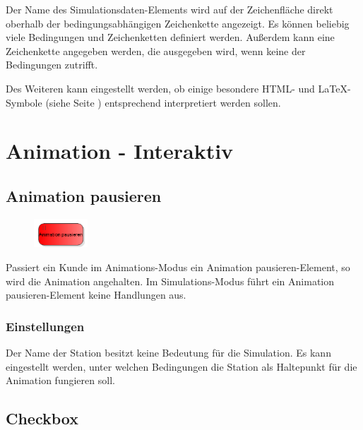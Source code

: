 Der Name des Simulationsdaten-Elements wird auf der Zeichenfläche direkt oberhalb der bedingungsabhängigen Zeichenkette angezeigt.
Es können beliebig viele Bedingungen und Zeichenketten definiert werden.
Außerdem kann eine Zeichenkette angegeben werden, die ausgegeben wird, wenn keine der Bedingungen zutrifft.

Des Weiteren kann eingestellt werden, ob einige besondere HTML- und LaTeX-Symbole (siehe Seite \pageref{ref:TextEntities}) entsprechend
interpretiert werden sollen.





\chapter{Animation - Interaktiv}

\section{Animation pausieren}
\label{ref:ModelElementAnimationPause}

\begin{figure}
\vspace{-22pt}
\includegraphics[width=2cm]{imageModelElementAnimationPause.png}
\vspace{-22pt}
\end{figure}

Passiert ein Kunde im Animations-Modus ein Animation pausieren-Element, so wird die Animation angehalten.
Im Simulations-Modus führt ein Animation pausieren-Element keine Handlungen aus.

\subsection*{Einstellungen}

Der Name der Station besitzt keine Bedeutung für die Simulation.
Es kann eingestellt werden, unter welchen Bedingungen die Station als Haltepunkt
für die Animation fungieren soll.


\section{Checkbox}
\label{ref:ModelElementInteractiveCheckbox}

